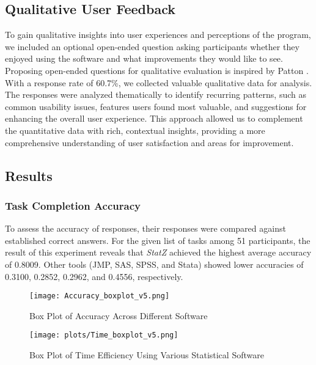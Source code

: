 \documentclass{article}
\begin{document}
\subsection{Qualitative User Feedback}
To gain qualitative insights into user experiences and perceptions of the program, we included an optional open-ended question asking participants whether they enjoyed using the software and what improvements they would like to see. Proposing open-ended questions for qualitative evaluation is inspired by Patton \cite{patton1990qualitative}. With a response rate of 60.7\%, we collected valuable qualitative data for analysis. The responses were analyzed thematically to identify recurring patterns, such as common usability issues, features users found most valuable, and suggestions for enhancing the overall user experience. This approach allowed us to complement the quantitative data with rich, contextual insights, providing a more comprehensive understanding of user satisfaction and areas for improvement.

\subsection{Results}
\subsubsection{Task Completion Accuracy}
To assess the accuracy of responses, their responses were compared against established correct answers. For the given list of tasks among 51 participants, the result of this experiment reveals that \textit{StatZ} achieved the highest average accuracy of 0.8009. Other tools (JMP, SAS, SPSS, and Stata) showed lower accuracies of 0.3100, 0.2852, 0.2962, and 0.4556, respectively. 

\begin{figure}[htb]
  \centering
  \begin{minipage}{0.48\textwidth}
    \centering
    \texttt{[image: Accuracy\_boxplot\_v5.png]}
  \caption{Box Plot of Accuracy Across Different Software}
  \label{fig:accuracy_box_plot}
  \end{minipage}
  \hfill
  \begin{minipage}{0.48\textwidth}
    \centering
    \texttt{[image: plots/Time\_boxplot\_v5.png]}
  \caption{Box Plot of Time Efficiency Using Various Statistical Software}
  \label{fig:time_box_plot}
  \end{minipage}
\end{figure}
\end{document}
